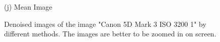 \documentclass[10pt,twocolumn,letterpaper]{article}
\begin{document}
\begin{figure}
{\begin{minipage}[t]{0.195\textwidth}
{\footnotesize (j) Mean Image}
\end{minipage}
}
\caption{Denoised images of the image "Canon 5D Mark 3 ISO 3200 1" by different methods. The images are better to be zoomed in on screen.}
\label{fig3}
\end{figure}


\begin{figure}
\centering
{}
\end{figure}
\end{document}
